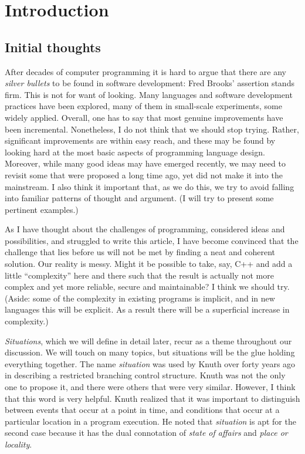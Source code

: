 \documentclass[10pt]{amsart}
\begin{document}
\section{Introduction}


\subsection{Initial thoughts}

After decades of computer programming it is hard to argue that there
are any \emph{silver bullets} to be found in software development:
Fred Brooks' assertion stands firm.  This is not for want of looking.
Many languages and software development practices have been explored,
many of them in small-scale experiments, some widely applied.
Overall, one has to say that most genuine improvements have been
incremental.  Nonetheless, I do not think that we should stop trying.
Rather, significant improvements are within easy reach, and these may
be found by looking hard at the most basic aspects of programming
language design.  Moreover, while many good ideas may have emerged
recently, we may need to revisit some that were proposed a long time
ago, yet did not make it into the mainstream.  I also think it
important that, as we do this, we try to avoid falling into familiar
patterns of thought and argument.  (I will try to present some
pertinent examples.)

As I have thought about the challenges of programming, considered
ideas and possibilities, and struggled to write this article, I have
become convinced that the challenge that lies before us will not be
met by finding a neat and coherent solution.  Our reality is messy.
Might it be possible to take, say, C++ and add a little ``complexity''
here and there such that the result is actually not more complex and
yet more reliable, secure and maintainable?  I think we should try.
(Aside: some of the complexity in existing programs is implicit, and
in new languages this will be explicit.  As a result there will be a
superficial increase in complexity.)

\emph{Situations}, which we will define in detail later, recur as a
theme throughout our discussion.  We will touch on many topics, but
situations will be the glue holding everything together.  The name
\emph{situation} was used by Knuth over forty years ago in describing
a restricted branching control structure.  Knuth was not the only one
to propose it, and there were others that were very similar.  However,
I think that this word is very helpful.  Knuth realized that it was
important to distinguish between events that occur at a point in time,
and conditions that occur at a particular location in a program
execution.  He noted that \emph{situation} is apt for the second case
because it has the dual connotation of \emph{state of affairs} and
\emph{place or locality}.
\end{document}

